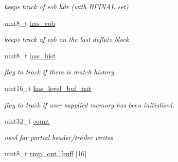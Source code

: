 \begin{DoxyCompactItemize}
\begin{DoxyCompactList}\small\item\em keeps track of eob hdr (with B\-F\-I\-N\-A\-L set) \end{DoxyCompactList}\item 
\hypertarget{structisal__zstate_a1a0944cac395cfb6b63d5737ebc116c3}{uint8\-\_\-t \hyperlink{structisal__zstate_a1a0944cac395cfb6b63d5737ebc116c3}{has\-\_\-eob}}\label{structisal__zstate_a1a0944cac395cfb6b63d5737ebc116c3}

\begin{DoxyCompactList}\small\item\em keeps track of eob on the last deflate block \end{DoxyCompactList}\item 
\hypertarget{structisal__zstate_a5e1e89dd31dfee589dcf7ef3e42aa1ef}{uint8\-\_\-t \hyperlink{structisal__zstate_a5e1e89dd31dfee589dcf7ef3e42aa1ef}{has\-\_\-hist}}\label{structisal__zstate_a5e1e89dd31dfee589dcf7ef3e42aa1ef}

\begin{DoxyCompactList}\small\item\em flag to track if there is match history \end{DoxyCompactList}\item 
\hypertarget{structisal__zstate_a3f0312f301a4bdf551dc19ea0f65d814}{uint16\-\_\-t \hyperlink{structisal__zstate_a3f0312f301a4bdf551dc19ea0f65d814}{has\-\_\-level\-\_\-buf\-\_\-init}}\label{structisal__zstate_a3f0312f301a4bdf551dc19ea0f65d814}

\begin{DoxyCompactList}\small\item\em flag to track if user supplied memory has been initialized. \end{DoxyCompactList}\item 
\hypertarget{structisal__zstate_a73a55d919202b77b7c75dbf041aed60d}{uint32\-\_\-t \hyperlink{structisal__zstate_a73a55d919202b77b7c75dbf041aed60d}{count}}\label{structisal__zstate_a73a55d919202b77b7c75dbf041aed60d}

\begin{DoxyCompactList}\small\item\em used for partial header/trailer writes \end{DoxyCompactList}\item 
\hypertarget{structisal__zstate_ac4647cb8161a09ee3571a5b23fb31ede}{uint8\-\_\-t \hyperlink{structisal__zstate_ac4647cb8161a09ee3571a5b23fb31ede}{tmp\-\_\-out\-\_\-buff} \mbox{[}16\mbox{]}}\label{structisal__zstate_ac4647cb8161a09ee3571a5b23fb31ede}


\end{DoxyCompactItemize}
